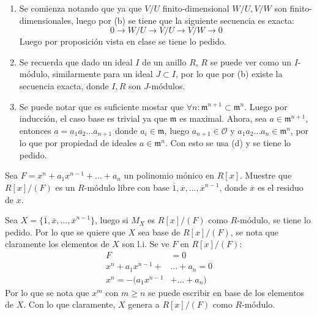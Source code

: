 \begin{sol}{2.49}
\begin{enumerate}
        \item Se comienza notando que ya que \(V/U\) finito-dimensional \(W/U,V/W\) son finito-dimensionales, luego por (b) se tiene que la siguiente secuencia es exacta:
              \[0\rightarrow W/U\rightarrow V/U\rightarrow V/W\rightarrow 0\]
              Luego por proposición vista en clase se tiene lo pedido.
        \item Se recuerda que dado un ideal \(I\) de un anillo \(R\), \(R\) se puede ver como un \(I\)-módulo, similarmente para un ideal \(J\subset I\), por lo que por (b) existe la secuencia exacta, donde \(I,R\) son \(J\)-módulos.
        \item Se puede notar que es suficiente mostar que \(\forall n:\mathfrak{m}^{n+1}\subset\mathfrak{m}^n\). Luego por inducción, el caso base es trivial ya que \(\mathfrak{m}\) es maximal. Ahora, sea \(a\in\mathfrak{m}^{n+1}\), entonces \(a=a_1a_2\dots a_{n+1}\) donde \(a_i\in\mathfrak{m}\), luego \(a_{n+1}\in\mathcal{O}\) y \(a_1a_2\dots a_n\in\mathfrak{m}^n\), por lo que por propiedad de ideales \(a\in\mathfrak{m}^n\). Con esto se usa (d) y se tiene lo pedido.

    \end{enumerate}
\end{sol}

\begin{prob}{2.55}
    Sea \(F=x^n+a_1x^{n-1}+\dots +a_n\) un polinomio mónico en \(R[x]\). Muestre que \(R[x]/(F)\) es un \(R\)-módulo libre con base \(\overline{1},\overline{x},\dots ,\overline{x}^{n-1}\), donde \(\overline{x}\) es el residuo de \(x\).
\end{prob}

\begin{sol}{2.55}
    Sea \(X=\{\overline{1},\overline{x},\dots,\overline{x}^{n-1}\}\), luego si \(M_X\) es \(R[x]/(F)\) como \(R\)-módulo, se tiene lo pedido. Por lo que se quiere que \(X\) sea base de \(R[x]/(F)\), se nota que claramente los elementos de \(X\) son l.i. Se ve \(F\) en \(R[x]/(F)\):
    \begin{align*}
        F                & =0          \\
        x^n+a_1x^{n-1}+  & \dots+a_n=0 \\
        x^n=-(a_1x^{n-1} & +\dots+a_n)
    \end{align*}
    Por lo que se nota que \(x^m\) con \(m\geq n\) se puede escribir en base de los elementos de \(X\). Con lo que claramente, \(X\) genera    a \(R[x]/(F)\) como \(R\)-módulo.
\end{sol}



